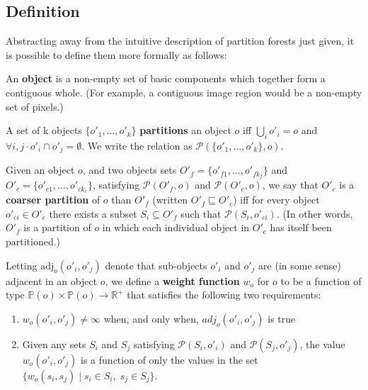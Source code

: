 \subsection{Definition}

Abstracting away from the intuitive description of partition forests just given, it is possible to define them more formally as follows:

\begin{definition}
An \textbf{object} is a non-empty set of basic components which together form a contiguous whole. (For example, a contiguous image region would be a non-empty set of pixels.)
\end{definition}

\begin{definition}
A set of k objects $\{o'_1,\ldots,o'_k\}$ \textbf{partitions} an object $o$ iff $\bigcup_i o'_i = o$ and $\forall i,j \cdot o'_i \cap o'_j = \emptyset$. We write the relation as $\mathcal{P}(\{o'_1,\ldots,o'_k\}, o)$.
\end{definition}

\begin{definition}
Given an object $o$, and two objects sets $O'_f = \{o'_{f1},\ldots,o'_{fk_f}\}$ and $O'_c = \{o'_{c1},\ldots,o'_{ck_c}\}$, satisfying $\mathcal{P}(O'_f,o)$ and $\mathcal{P}(O'_c,o)$, we say that $O'_c$ is a \textbf{coarser partition} of $o$ than $O'_f$ (written $O'_f \sqsubseteq O'_c$) iff for every object $o'_{ci} \in O'_c$ there exists a subset $S_i \subseteq O'_f$ such that $\mathcal{P}(S_i,o'_{ci})$. (In other words, $O'_f$ is a partition of $o$ in which each individual object in $O'_c$ has itself been partitioned.)
\end{definition}

\begin{definition}
Letting $\mbox{adj}_o(o'_i, o'_j)$ denote that sub-objects $o'_i$ and $o'_j$ are (in some sense) adjacent in an object $o$, we define a \textbf{weight function} $w_o$ for $o$ to be a function of type $\mathbb{P}(o) \times \mathbb{P}(o) \to \mathbb{R}^+$ that satisfies the following two requirements:
%
\begin{enumerate}

\item $w_o(o'_i, o'_j) \ne \infty$ when, and only when, $adj_o(o'_i, o'_j)$ is true

\item Given any sets $S_i$ and $S_j$ satisfying $\mathcal{P}(S_i,o'_i)$ and $\mathcal{P}(S_j,o'_j)$, the value $w_o(o'_i, o'_j)$ is a function of only the values in the set $\{w_o(s_i, s_j) \; | \; s_i \in S_i, \; s_j \in S_j\}$.

\end{enumerate}

\end{definition}


